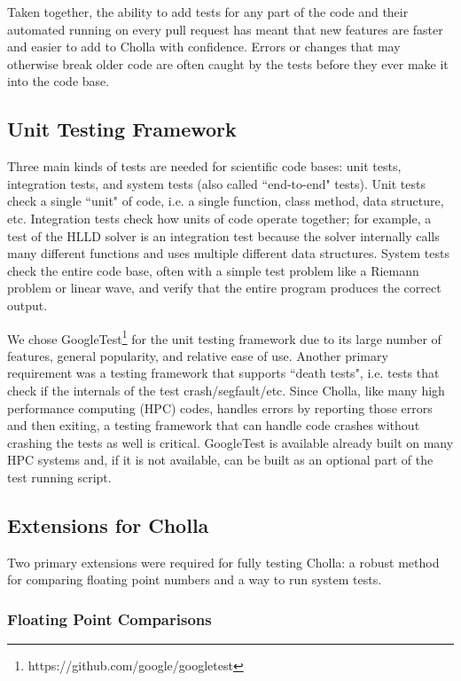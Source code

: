 \documentclass[modern, linenumbers]{aastex631}
\begin{document}
Taken together, the ability to add tests for any part of the code and their automated running on every pull request has meant that new features are faster and easier to add to Cholla with confidence. Errors or changes that may otherwise break older code are often caught by the tests before they ever make it into the code base.

\subsection{Unit Testing Framework}
\label{sec:testing-framework}

Three main kinds of tests are needed for scientific code bases: unit tests, integration tests, and system tests (also called ``end-to-end" tests). Unit tests check a single ``unit" of code, i.e. a single function, class method, data structure, etc. Integration tests check how units of code operate together; for example, a test of the HLLD solver is an integration test because the solver internally calls many different functions and uses multiple different data structures. System tests check the entire code base, often with a simple test problem like a Riemann problem or linear wave, and verify that the entire program produces the correct output.

We chose GoogleTest\footnote{https://github.com/google/googletest} for the unit testing framework due to its large number of features, general popularity, and relative ease of use. Another primary requirement was a testing framework that supports ``death tests", i.e. tests that check if the internals of the test crash/segfault/etc. Since Cholla, like many high performance computing (HPC) codes, handles errors by reporting those errors and then exiting, a testing framework that can handle code crashes without crashing the tests as well is critical. GoogleTest is available already built on many HPC systems and, if it is not available, can be built as an optional part of the test running script.

\subsection{Extensions for Cholla}

Two primary extensions were required for fully testing Cholla: a robust method for comparing floating point numbers and a way to run system tests.

\subsubsection{Floating Point Comparisons}
\label{sec:fp-comparing}
\end{document}
